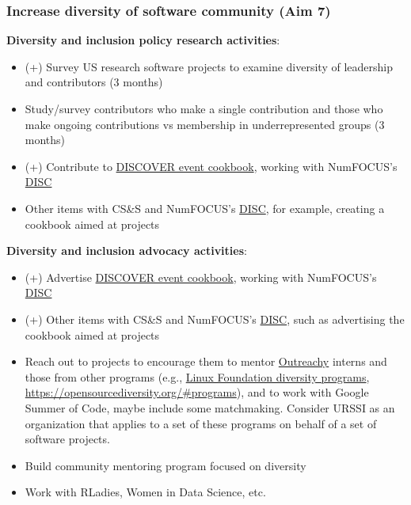 \documentclass[
]{book}
\begin{document}
\hypertarget{increase-diversity-of-software-community-aim-7}{%
\subsubsection{Increase diversity of software community (Aim 7)}\label{increase-diversity-of-software-community-aim-7}}

\textbf{Diversity and inclusion policy research activities}:

\begin{itemize}
\item
  (+) Survey US research software projects to examine diversity of leadership and contributors (3 months)
\item
  Study/survey contributors who make a single contribution and those who make ongoing contributions
  vs membership in underrepresented groups (3 months)
\item
  (+) Contribute to \href{https://discover-cookbook.numfocus.org}{DISCOVER event cookbook}, working with
  NumFOCUS's \href{https://numfocus.org/programs/diversity-inclusion}{DISC}
\item
  Other items with CS\&S and NumFOCUS's \href{https://numfocus.org/programs/diversity-inclusion}{DISC},
  for example, creating a cookbook aimed at projects
\end{itemize}

\textbf{Diversity and inclusion advocacy activities}:

\begin{itemize}
\item
  (+) Advertise \href{https://discover-cookbook.numfocus.org}{DISCOVER event cookbook}, working with
  NumFOCUS's \href{https://numfocus.org/programs/diversity-inclusion}{DISC}
\item
  (+) Other items with CS\&S and NumFOCUS's \href{https://numfocus.org/programs/diversity-inclusion}{DISC},
  such as advertising the cookbook aimed at projects
\item
  Reach out to projects to encourage them to mentor \href{https://www.outreachy.org}{Outreachy} interns
  and those from other programs (e.g.,
  \href{https://www.linuxfoundation.org/about/diversity-inclusiveness/programs/}{Linux Foundation diversity programs},
  \url{https://opensourcediversity.org/\#programs}), and to work with Google Summer of Code, maybe
  include some matchmaking. Consider URSSI as an organization that applies to a set of these
  programs on behalf of a set of software projects.
\item
  Build community mentoring program focused on diversity
\item
  Work with RLadies, Women in Data Science, etc.
\end{itemize}
\end{document}
